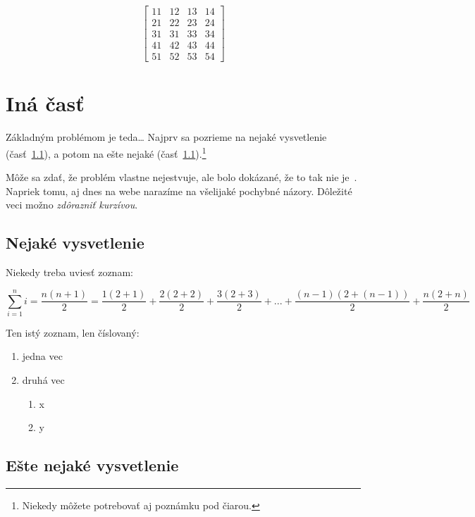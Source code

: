 \documentclass[10pt,twoside,slovak,a4paper]{article}
\begin{document}
\[
\begin{bmatrix}
11 & 12 & 13 & 14 \\
21 & 22 & 23 & 24 \\
31 & 31 & 33 & 34 \\
41 & 42 & 43 & 44 \\
51 & 52 & 53 & 54
\end{bmatrix}
\]



\section{Iná časť} \label{ina}

Základným problémom je teda\ldots{} Najprv sa pozrieme na nejaké vysvetlenie (časť~\ref{ina:nejake}), a potom na ešte nejaké (časť~\ref{ina:nejake}).\footnote{Niekedy môžete potrebovať aj poznámku pod čiarou.}

Môže sa zdať, že problém vlastne nejestvuje\cite{Coplien:MPD}, ale bolo dokázané, že to tak nie je~\cite{Czarnecki:Staged, Czarnecki:Progress}. Napriek tomu, aj dnes na webe narazíme na všelijaké pochybné názory\cite{PLP-Framework}. Dôležité veci možno \emph{zdôrazniť kurzívou}.


\subsection{Nejaké vysvetlenie} \label{ina:nejake}

Niekedy treba uviesť zoznam:


\begin{equation}
\sum_{i=1}^{n} i = \frac{n(n+1)}{2} =  \frac{1(2+1)}{2}+\frac{2(2+2)}{2}+\frac{3(2+3)}{2}+ ...
 + \frac{(n-1)(2+(n-1))}{2}+\frac{n(2+n)}{2}
\end{equation}


Ten istý zoznam, len číslovaný:

\begin{enumerate}
\item jedna vec
\item druhá vec
	\begin{enumerate}
	\item x
	\item y
	\end{enumerate}
\end{enumerate}


\subsection{Ešte nejaké vysvetlenie} \label{ina:este}
\end{document}

